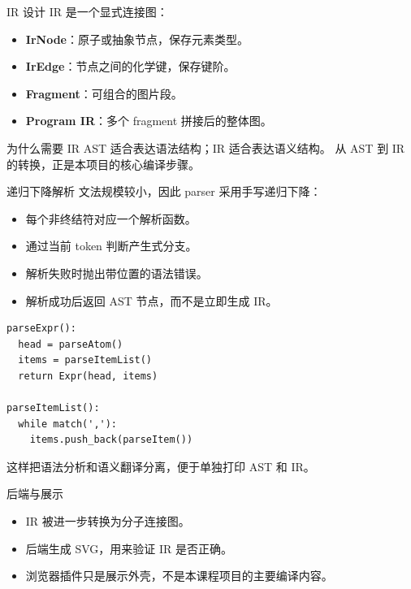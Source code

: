 \documentclass{beamer}
\begin{document}
\begin{frame}{IR 设计}
    IR 是一个显式连接图：
    \begin{itemize}
        \item \textbf{IrNode}：原子或抽象节点，保存元素类型。
        \item \textbf{IrEdge}：节点之间的化学键，保存键阶。
        \item \textbf{Fragment}：可组合的图片段。
        \item \textbf{Program IR}：多个 fragment 拼接后的整体图。
    \end{itemize}

    \vspace{0.5em}
    \begin{block}{为什么需要 IR}
        AST 适合表达语法结构；IR 适合表达语义结构。
        从 AST 到 IR 的转换，正是本项目的核心编译步骤。
    \end{block}
\end{frame}

\begin{frame}[fragile]{递归下降解析}
    文法规模较小，因此 parser 采用手写递归下降：
    \begin{itemize}
        \item 每个非终结符对应一个解析函数。
        \item 通过当前 token 判断产生式分支。
        \item 解析失败时抛出带位置的语法错误。
        \item 解析成功后返回 AST 节点，而不是立即生成 IR。
    \end{itemize}

    \begin{lstlisting}
parseExpr():
  head = parseAtom()
  items = parseItemList()
  return Expr(head, items)

parseItemList():
  while match(','):
    items.push_back(parseItem())
    \end{lstlisting}

    这样把语法分析和语义翻译分离，便于单独打印 AST 和 IR。
\end{frame}

\begin{frame}{后端与展示}
    \begin{itemize}
        \item IR 被进一步转换为分子连接图。
        \item 后端生成 SVG，用来验证 IR 是否正确。
        \item 浏览器插件只是展示外壳，不是本课程项目的主要编译内容。
    \end{itemize}
\end{frame}
\end{document}

